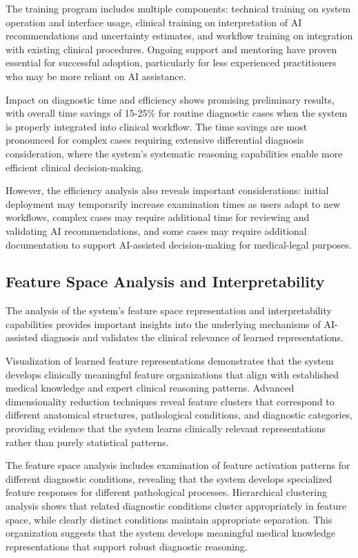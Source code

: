 The training program includes multiple components: technical training on system operation and interface usage, clinical training on interpretation of AI recommendations and uncertainty estimates, and workflow training on integration with existing clinical procedures. Ongoing support and mentoring have proven essential for successful adoption, particularly for less experienced practitioners who may be more reliant on AI assistance.

Impact on diagnostic time and efficiency shows promising preliminary results, with overall time savings of 15-25\% for routine diagnostic cases when the system is properly integrated into clinical workflow. The time savings are most pronounced for complex cases requiring extensive differential diagnosis consideration, where the system's systematic reasoning capabilities enable more efficient clinical decision-making.

However, the efficiency analysis also reveals important considerations: initial deployment may temporarily increase examination times as users adapt to new workflows, complex cases may require additional time for reviewing and validating AI recommendations, and some cases may require additional documentation to support AI-assisted decision-making for medical-legal purposes.

\subsection{Feature Space Analysis and Interpretability}

The analysis of the system's feature space representation and interpretability capabilities provides important insights into the underlying mechanisms of AI-assisted diagnosis and validates the clinical relevance of learned representations.

Visualization of learned feature representations demonstrates that the system develops clinically meaningful feature organizations that align with established medical knowledge and expert clinical reasoning patterns. Advanced dimensionality reduction techniques reveal feature clusters that correspond to different anatomical structures, pathological conditions, and diagnostic categories, providing evidence that the system learns clinically relevant representations rather than purely statistical patterns.

The feature space analysis includes examination of feature activation patterns for different diagnostic conditions, revealing that the system develops specialized feature responses for different pathological processes. Hierarchical clustering analysis shows that related diagnostic conditions cluster appropriately in feature space, while clearly distinct conditions maintain appropriate separation. This organization suggests that the system develops meaningful medical knowledge representations that support robust diagnostic reasoning.


